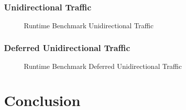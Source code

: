 \documentclass[11pt,a4paper,twoside,openright,bibliography=totoc]{scrbook}
\begin{document}
\clearpage

\subsection{Unidirectional Traffic}
\label{sec:unid-traff}

\begin{figure}[H]
  \centering
   
  \caption{Runtime Benchmark Unidirectional Traffic}
  \label{fig:time-uni}
\end{figure}

\clearpage

\subsection{Deferred Unidirectional Traffic}
\label{sec:deferr-unid-traff-1}

\begin{figure}[H]
  \centering
   
  \caption{Runtime Benchmark Deferred Unidirectional Traffic}
  \label{fig:time-def-uni}
\end{figure}


\chapter{Conclusion}
\label{chap:conclusion}





\listoffigures
\end{document}
